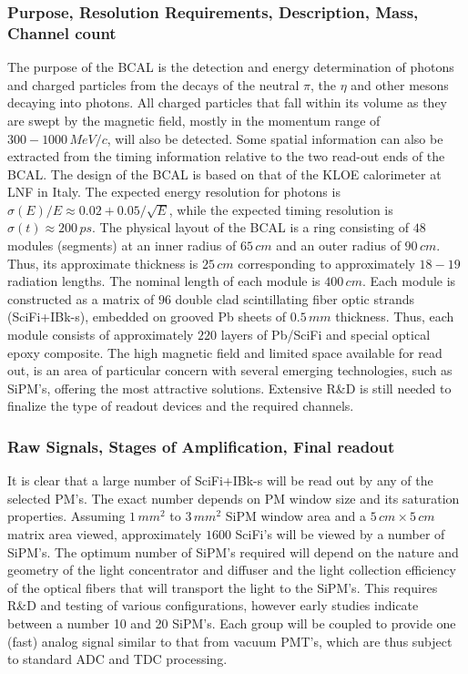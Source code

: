 \subsubsection*{Purpose, Resolution Requirements, Description, Mass, Channel count}
The purpose of the BCAL is the detection and energy determination
of photons and charged particles from the decays of the neutral
$\pi$, the $\eta$ and other mesons decaying into photons.  All
charged particles that fall within its volume as they are swept
by the magnetic field, mostly in the momentum range of $300-1000\, MeV/c$,
will also be detected.  Some spatial information can also be extracted
from the timing information relative to the two read-out ends of the BCAL.
The design of the BCAL is based on that of the KLOE calorimeter at LNF
in Italy. The expected energy resolution for photons is
$\sigma(E)/E\approx 0.02+0.05/\sqrt{E}$, while the expected timing
resolution is $\sigma(t)\approx 200\,ps$.  The physical layout of the
BCAL is a ring consisting of $48$ modules (segments) at an inner radius
of $65\,cm$ and an outer radius of $90\, cm$.   Thus, its  approximate thickness
is $25\, cm$ corresponding to approximately $18-19$ radiation lengths. The nominal
length of each module is $400\, cm$.  Each module is constructed as a matrix
of $96$ double clad scintillating fiber optic strands (SciFi+IBk-s), embedded
on grooved Pb sheets of $0.5\, mm$ thickness. Thus, each module consists of
approximately $220$ layers of Pb/SciFi and special optical epoxy composite.
The high magnetic field and limited space available for read out, is an
area of particular concern with several emerging technologies, such
as SiPM's, offering the most attractive solutions. Extensive R\&D is still
needed to finalize the type of readout devices and the required channels.


\subsubsection*{Raw Signals, Stages of Amplification, Final readout}
It is clear that a large number of SciFi+IBk-s will be read out by any of the
selected PM's.  The exact number depends on PM window size and its saturation
properties.   Assuming $1\, mm^{2}$ to $3\, mm^{2}$ SiPM window area and a 
$5\,cm \times 5\, cm$ matrix area viewed, approximately $1600$ SciFi's will 
be viewed by a number of SiPM's. The optimum number of SiPM's required will 
depend on the nature and geometry
of the light concentrator and diffuser and the light collection efficiency of
the optical fibers that will transport the light to the SiPM's.   This
requires R\&D and testing of various configurations, however early studies
indicate between a number 10 and 20 SiPM's.  Each group will be coupled to
provide one (fast) analog signal similar to that from vacuum PMT's, which
are thus subject to standard ADC and TDC processing.




